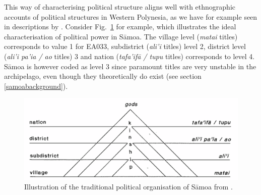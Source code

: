 \documentclass[a4paper,10pt]{article} %
\begin{document}
This way of characterising political structure aligns well with ethnographic accounts of political structures in Western Polynesia, as we have for example seen in descriptions by \citet{sahlins63}. Consider Fig.~\ref{meleiseapyramid} \citep[22]{meleisea1995} for example, which illustrates the ideal characterisation of political power in S\={a}moa. The village level (\emph{matai} titles) corresponds to value 1 for EA033, subdistrict (\emph{ali'i} titles) level 2, district level (\emph{ali'i pa'ia / ao} titles) 3 and nation (\emph{tafa'if\={a} / tupu} titles) corresponds to level 4. S\={a}moa is however coded as level 3 since paramount titles are very unstable in the archipelago, even though they theoretically do exist (see section \ref{samoabackground}).


\begin{figure}[H]
\centering
\includegraphics[width=13cm]{illustrations/pyramid_meleisea.png}
\caption[Illustration of traditional political organisation of S\={a}moa.]{{Illustration of the traditional political organisation of S\={a}moa from \citet[22]{meleisea1995}.}}
\label{meleiseapyramid}
\end{figure}
\end{document}
